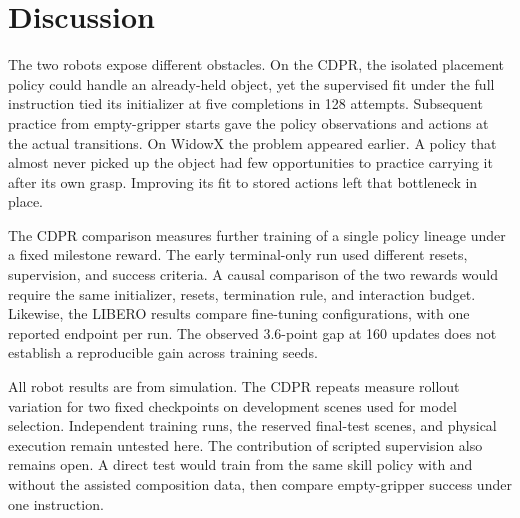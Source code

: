 \section{Discussion}\label{sec:discussion}
The two robots expose different obstacles. On the CDPR, the isolated placement policy could handle an already-held object, yet the supervised fit under the full instruction tied its initializer at five completions in 128 attempts. Subsequent practice from empty-gripper starts gave the policy observations and actions at the actual transitions. On WidowX the problem appeared earlier. A policy that almost never picked up the object had few opportunities to practice carrying it after its own grasp. Improving its fit to stored actions left that bottleneck in place.

The CDPR comparison measures further training of a single policy lineage under a fixed milestone reward. The early terminal-only run used different resets, supervision, and success criteria. A causal comparison of the two rewards would require the same initializer, resets, termination rule, and interaction budget. Likewise, the LIBERO results compare fine-tuning configurations, with one reported endpoint per run. The observed 3.6-point gap at 160 updates does not establish a reproducible gain across training seeds.

All robot results are from simulation. The CDPR repeats measure rollout variation for two fixed checkpoints on development scenes used for model selection. Independent training runs, the reserved final-test scenes, and physical execution remain untested here. The contribution of scripted supervision also remains open. A direct test would train from the same skill policy with and without the assisted composition data, then compare empty-gripper success under one instruction.
